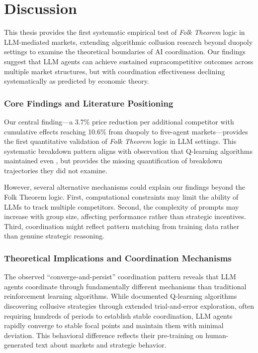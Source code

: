 \section{Discussion}\label{sec:dis}

This thesis provides the first systematic empirical test of \emph{Folk Theorem} logic in LLM-mediated markets, extending algorithmic collusion research beyond duopoly settings to examine the theoretical boundaries of AI coordination. Our findings suggest that LLM agents can achieve sustained supracompetitive outcomes across multiple market structures, but with coordination effectiveness declining systematically as predicted by economic theory.

\subsubsection*{Core Findings and Literature Positioning}

Our central finding—a 3.7\% price reduction per additional competitor with cumulative effects reaching 10.6\% from duopoly to five-agent markets—provides the first quantitative validation of \emph{Folk Theorem} logic in LLM settings. This systematic breakdown pattern aligns with \textcite[p. 3268]{calvano_artificial_2020} observation that Q-learning algorithms maintained  even , but provides the missing quantification of breakdown trajectories they did not examine.

However, several alternative mechanisms could explain our findings beyond the Folk Theorem logic. First, computational constraints may limit the ability of LLMs to track multiple competitors. Second, the complexity of prompts may increase with group size, affecting performance rather than strategic incentives. Third, coordination might reflect pattern matching from training data rather than genuine strategic reasoning.

\subsubsection*{Theoretical Implications and Coordination Mechanisms}

The observed \enquote{converge-and-persist} coordination pattern reveals that LLM agents coordinate through fundamentally different mechanisms than traditional reinforcement learning algorithms. While \textcite{calvano_artificial_2020,calvano_algorithmic_2021} documented Q-learning algorithms discovering collusive strategies through extended trial-and-error exploration, often requiring hundreds of periods to establish stable coordination, LLM agents rapidly converge to stable focal points and maintain them with minimal deviation. This behavioral difference reflects their pre-training on human-generated text about markets and strategic behavior.

